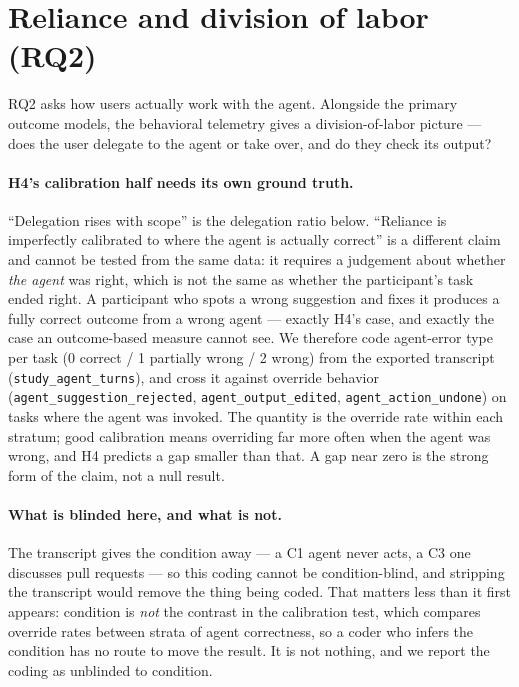 \documentclass[11pt]{article}
\newcommand{\code}[1]{\texttt{#1}}
\begin{document}
\section{Reliance and division of labor (RQ2)}

RQ2 asks how users actually work with the agent. Alongside the primary outcome
models, the behavioral telemetry gives a division-of-labor picture --- does the
user delegate to the agent or take over, and do they check its output?

\paragraph{H4's calibration half needs its own ground truth.} ``Delegation rises
with scope'' is the delegation ratio below. ``Reliance is imperfectly calibrated
to where the agent is actually correct'' is a different claim and cannot be
tested from the same data: it requires a judgement about whether \emph{the
agent} was right, which is not the same as whether the participant's task ended
right. A participant who spots a wrong suggestion and fixes it produces a fully
correct outcome from a wrong agent --- exactly H4's case, and exactly the case an
outcome-based measure cannot see. We therefore code agent-error type per task
(0 correct / 1 partially wrong / 2 wrong) from the exported transcript
(\code{study\_agent\_turns}), and cross it against override behavior
(\code{agent\_suggestion\_rejected}, \code{agent\_output\_edited},
\code{agent\_action\_undone}) on tasks where the agent was invoked. The quantity
is the override rate within each stratum; good calibration means overriding far
more often when the agent was wrong, and H4 predicts a gap smaller than that. A
gap near zero is the strong form of the claim, not a null result.

\paragraph{What is blinded here, and what is not.} The transcript gives the
condition away --- a C1 agent never acts, a C3 one discusses pull requests --- so
this coding cannot be condition-blind, and stripping the transcript would remove
the thing being coded. That matters less than it first appears: condition is
\emph{not} the contrast in the calibration test, which compares override rates
between strata of agent correctness, so a coder who infers the condition has no
route to move the result. It is not nothing, and we report the coding as
unblinded to condition.
\end{document}
